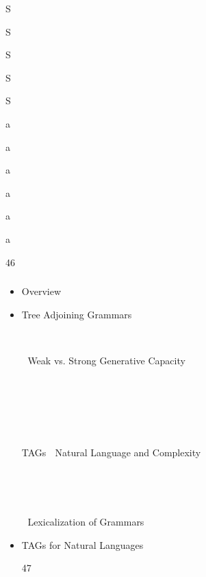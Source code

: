 \documentclass[compress,color=usenames]{beamer}
\begin{document}
\begin{frame}
\begin{itemize}
S





S





S





S





S





a





a





a





a





a





a





46




\end{itemize}

\end{frame}

\begin{frame}
\frametitle{}

\begin{itemize}
\item

Overview





\item Tree Adjoining Grammars





 Weak vs. Strong Generative Capacity











TAGs  Natural Language and Complexity








 Lexicalization of Grammars





\item TAGs for Natural Languages





47




\end{itemize}

\end{frame}
\end{document}
